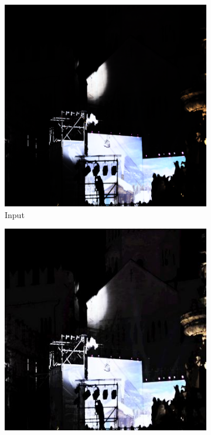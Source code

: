 \documentclass[a4paper]{ctexart}
\begin{document}
		\begin{figure}[htb]
			\centering
			\begin{subfigure}{0.19\textwidth}
				\includegraphics[width=\linewidth]{picture/LLIE/Experiment/input2}
				\captionsetup{font=scriptsize}
				\caption{Input}
				\label{fig: input2}
			\end{subfigure}
			\begin{subfigure}{0.19\textwidth}
				\includegraphics[width=\linewidth]{picture/LLIE/Experiment/Zero-DCE2}				

\end{subfigure}
\end{figure}
\end{document}
